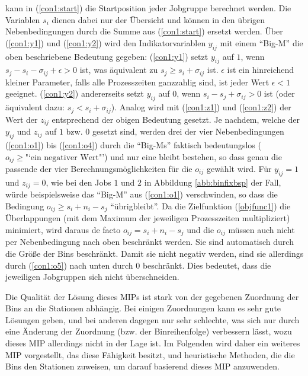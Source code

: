 \documentclass{scrreprt}
\begin{document}
kann in (\ref{con1:start}) die Startposition jeder Jobgruppe berechnet werden.
Die Variablen $s_i$ dienen dabei nur der Übersicht und können in den übrigen 
Nebenbedingungen durch die Summe aus (\ref{con1:start}) ersetzt werden.
Über (\ref{con1:y1}) und (\ref{con1:y2}) wird den Indikatorvariablen $y_{ij}$ 
mit einem "`Big-M"' die oben beschriebene Bedeutung gegeben:
(\ref{con1:y1}) setzt $y_{ij}$ auf $1$, wenn $s_j-s_i-\sigma_{ij}+\epsilon > 0$ ist,
was äquivalent zu $s_j \geq s_i+\sigma_{ij}$ ist.
$\epsilon$ ist ein hinreichend kleiner Parameter, falls alle Prozesszeiten ganzzahlig sind, ist jeder Wert $\epsilon<1$ geeignet.
(\ref{con1:y2}) andererseits setzt $y_{ij}$ auf $0$, wenn $s_i-s_j+\sigma_{ij} > 0$ ist (oder äquivalent dazu: $s_j < s_i+\sigma_{ij}$).
Analog wird mit (\ref{con1:z1}) und (\ref{con1:z2}) der Wert der $z_{ij}$ entsprechend der obigen Bedeutung gesetzt.
Je nachdem, welche der $y_{ij}$ und $z_{ij}$ auf $1$ bzw. $0$ gesetzt sind, 
werden drei der vier Nebenbedingungen (\ref{con1:o1}) bis (\ref{con1:o4}) durch die "`Big-Ms"' faktisch bedeutungslos ($o_{ij}\geq \text{"`ein negativer Wert"'}$)
und nur eine bleibt bestehen, so dass genau die passende der vier Berechnungsmöglichkeiten für die $o_{ij}$ gewählt wird.
Für $y_{ij}=1$ und $z_{ij}=0$, wie bei den Jobs $1$ und $2$ in Abbildung \ref{abb:binfixbsp} der Fall, 
würde beispielsweise das "`Big-M"' aus (\ref{con1:o1}) verschwinden, so dass die Bedingung $o_{ij}\geq s_i+n_i-s_j$ "`übrigbleibt"'.
Da die Zielfunktion (\ref{objfunc1}) die Überlappungen (mit dem Maximum der jeweiligen Prozesszeiten multipliziert) minimiert,
wird daraus de facto $o_{ij}=s_i+n_i-s_j$ und die $o_{ij}$ müssen auch nicht per Nebenbedingung nach oben beschränkt werden.
Sie sind automatisch durch die Größe der Bins beschränkt.
Damit sie nicht negativ werden, sind sie allerdings durch (\ref{con1:o5}) nach unten durch $0$ beschränkt.
Dies bedeutet, dass die jeweiligen Jobgruppen sich nicht überschneiden.

Die Qualität der Lösung dieses MIPs ist stark von der gegebenen Zuordnung der Bins an die Stationen abhängig.
Bei einigen Zuordnungen kann es sehr gute Lösungen geben, und bei anderen dagegen nur sehr schlechte, was sich nur durch eine
Änderung der Zuordnung (bzw. der Binreihenfolge) verbessern lässt, wozu dieses MIP allerdings nicht in der Lage ist.
Im Folgenden wird daher ein weiteres MIP vorgestellt, das diese Fähigkeit besitzt, und heuristische Methoden,
die die Bins den Stationen zuweisen, um darauf basierend dieses MIP anzuwenden.
\end{document}
